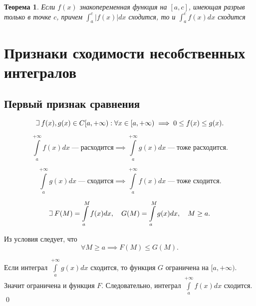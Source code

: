 \documentclass[a4paper,12pt,oneside]{extbook}
\def\lets{%
    \mathord{\setbox0=\hbox{$\exists$}%
        \hbox{\kern 0.125\wd0%
            \vbox to \ht0{%
                \hrule width 0.75\wd0%
                \vfill%
                \hrule width 0.75\wd0}%
            \vrule height \ht0%
            \kern 0.125\wd0}%
    }%
    \hspace{2pt}
}
\theoremstyle{numbered}
\theoremstyle{unnumbered}
\theoremstyle{named}
\newtheorem{theorem}{Теорема}[section]
\theoremstyle{unnumbered}
\theoremstyle{named}
\theoremstyle{named}
\theoremstyle{named}
\renewenvironment{proof}{{\noindent\textbf{Доказательство.}}}{\qed}
\begin{document}
\begin{theorem}
    Если \(f(x)\) знакопеременная функция на \([a, c]\), имеющая разрыв только в точке \(c\), причем \(\int_a^c |f(x)| dx\) сходится, то и \(\int_a^c f(x) dx\) сходится
\end{theorem}


\section{Признаки сходимости несобственных интегралов}%
\label{sec:Признаки сходимости несобственных интегралов}

\subsection{Первый признак сравнения}%
\label{sub:Первый признак сравнения}


\begin{equation}
    \lets f(x), g(x) \in C [a, +\infty): \forall x \in [a, +\infty) \implies 0 \leq f(x) \leq g(x).
\end{equation}

\begin{equation}
    \int\limits_{a}^{+\infty} f(x)dx \; — \; \text{расходится} \implies \int\limits_{a}^{+\infty} g(x)dx \; — \; \text{тоже расходится}.
\end{equation}

\begin{equation}
    \int\limits_{a}^{+\infty} g(x)dx \; — \; \text{сходится} \implies \int\limits_{a}^{+\infty} f(x)dx \; — \; \text{тоже сходится}.
\end{equation}

\begin{proof}
    \begin{equation}
        \lets F(M) = \int\limits_{a}^{M} f(x)dx,
        \quad
        G(M) = \int\limits_{a}^{M} g(x)dx,
        \quad
        M \geq a.
    \end{equation}

    Из условия следует, что
    \begin{equation}
        \forall M \geq a \implies F(M) \leq G(M).
    \end{equation}

    Если интеграл \(\int\limits_{a}^{+ \infty} g(x)dx\) сходится, то функция \(G\) ограничена на \([a, +\infty)\). Значит ограничена и функция \(F\). Следовательно, интеграл \(\int\limits_{a}^{+\infty} f(x)dx\) сходится.
\end{proof}
\end{document}
